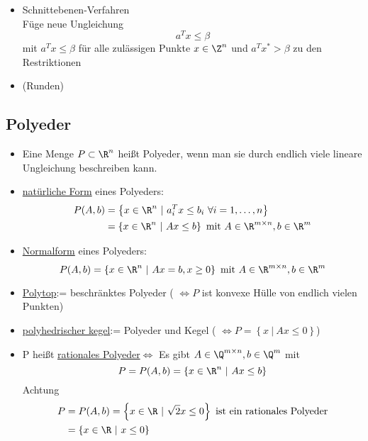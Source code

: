 \begin{beispiel}[Zuschnittsoptimierung]
\begin{enumerate}
\begin{itemize}
\begin{enumerate}[label = \arabic*. Fall:]
\begin{itemize}
            \item Schnittebenen-Verfahren\\
              Füge neue Ungleichung
              \begin{equation*}
                a^{T} x \leq \beta
              \end{equation*}
              mit $a^{T} x \leq \beta$ für alle zulässigen Punkte $x \in \Z^n$ und $a^{T} x^* > \beta $ zu den Restriktionen		
            \item (Runden)
				\end{itemize}
			\end{enumerate}
		\end{itemize}
\end{enumerate}
\end{beispiel}
\subsection{Polyeder}
\begin{definition}
	\begin{itemize}\
		\item Eine Menge $P\subset \R^n$ heißt Polyeder, wenn man sie durch endlich viele lineare Ungleichung beschreiben kann.
		\item \underline{natürliche Form} eines Polyeders:
			\begin{align*}
				P(A,b) &= \left\{ x \in \R^n\ | \ a^{T}_{i} x \leq b_{i} \ \forall i =1,\dots ,n \right\}\\
					   &= \left\{ x \in \R^n \ | \ Ax \leq b \right\} \text{ mit } A \in\R^{m\times n}, b\in \R^m
			\end{align*}
		\item \underline{Normalform} eines Polyeders:
			\begin{equation*}
				P(A,b) = \left\{ x \in \R^n \ | \ Ax = b, x\geq 0 \right\} \text{ mit } A \in\R^{m\times n}, b\in \R^m
			\end{equation*}
		\item \underline{Polytop}:= beschränktes Polyeder ( $\iff P$ ist konvexe Hülle von endlich vielen Punkten)	
		\item \underline{polyhedrischer kegel}:= Polyeder und Kegel ( $\iff P = \left\{x \ | \ Ax \leq 0 \right\}$)
		\item P heißt \underline{rationales Polyeder}$\iff$ Es gibt $A\in\Q^{m \times n}, b \in \Q^m$ mit
			\begin{equation*}
				P = P(A,b) = \left\{ x \in \R^n\ | \ Ax \leq b \right\}
			\end{equation*}
			Achtung
			\begin{align*}
				P &= P(A,b) = \left\{ x \in \R\ | \ \sqrt{2}x \leq 0 \right\} \text{ ist ein rationales Polyeder}\\
				  &= \left\{x \in \R \ | \ x \leq 0  \right\}
			\end{align*}
	\end{itemize}
\end{definition}
